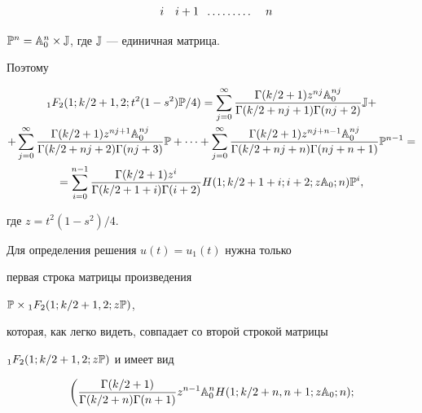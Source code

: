 \begin{pf}
\begin{align*}
\hspace{3mm} i \hspace{3.5mm} i+1\hspace{2mm} \dotsc\dotsc\dotsc \hspace{4mm} n


\end{align*} 


$\Bbb P^n=\Bbb A^n_0\times\Bbb J$, где $\Bbb J$ --- единичная матрица. 


Поэтому 


\begin{multline} 


{}_1F_2(1;k/2+1,2;t^2(1-s^2)\Bbb P/4)= 


\sum^\infty_{j=0}\frac{\Gamma(k/2+1)z^{nj}\Bbb A^{nj}_0} 


{\Gamma(k/2+nj+1)\Gamma(nj+2)}\Bbb J+ \\ 


% 


+\sum^\infty_{j=0}\frac{\Gamma(k/2+1)z^{nj+1}\Bbb A^{nj}_0} 


{\Gamma(k/2+nj+2)\Gamma(nj+3)}\Bbb P+\dotsb+ 


\sum^\infty_{j=0}\frac{\Gamma(k/2+1)z^{nj+n-1}\Bbb A^{nj}_0} 


{\Gamma(k/2+nj+n)\Gamma(nj+n+1)}\Bbb P^{n-1} = \\ 


% 


=\sum^{n-1}_{i=0}\frac{\Gamma(k/2+1)z^i} 


{\Gamma(k/2+1+i)\Gamma(i+2)} 


H(1;k/2+1+i;i+2;z\Bbb A_0;n)\Bbb P^i, 


\end{multline} 


где $z=t^2(1-s^2)/4$. 


 


Для определения решения $u(t)=u_1(t)$ нужна только 


первая строка матрицы произведения 


$\Bbb P\times{}_1F_2(1;k/2+1,2;z\Bbb P)$, 


которая, как легко видеть, совпадает со второй строкой матрицы  


${}_1F_2(1;k/2+1,2;z\Bbb P)$ и имеет вид 


\begin{multline*} 


\bigg(\frac{\Gamma(k/2+1)}{\Gamma(k/2+n)\Gamma(n+1)} 


z^{n-1}\Bbb A^n_0H(1;k/2+n,n+1;z\Bbb A_0;n); 



\end{multline*}
\end{pf}
